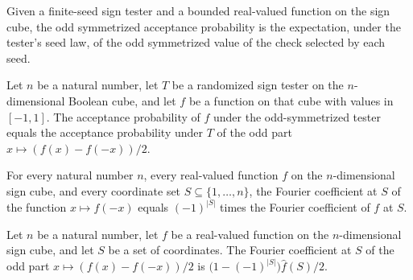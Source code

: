 \begin{definition}
\label{FABL.SignTester.oddSymmetrizedAcceptanceProbability}
\leanok
{}
Given a finite-seed sign tester and a bounded real-valued function on the sign cube, the
odd symmetrized acceptance probability is the expectation, under the tester's seed law,
of the odd symmetrized value of the check selected by each seed.
\end{definition}

\begin{theorem}
\label{FABL.SignTester.oddSymmetrizedAcceptanceProbability_eq_oddPart}
\leanok
{}
Let $n$ be a natural number, let $T$ be a randomized sign tester on the $n$-dimensional
Boolean cube, and let $f$ be a function on that cube with values in $[-1,1]$. The
acceptance probability of $f$ under the odd-symmetrized tester equals the acceptance
probability under $T$ of the odd part $x\mapsto(f(x)-f(-x))/2$.
\end{theorem}

\begin{theorem}
\label{FABL.fourierCoeff_comp_neg}
\leanok
{}
For every natural number $n$, every real-valued function $f$ on the $n$-dimensional sign
cube, and every coordinate set $S\subseteq\{1,\ldots,n\}$, the Fourier coefficient at
$S$ of the function $x\mapsto f(-x)$ equals $(-1)^{|S|}$ times the Fourier coefficient
of $f$ at $S$.
\end{theorem}

\begin{theorem}
\label{FABL.fourierCoeff_oddPart}
\leanok
{}
Let $n$ be a natural number, let $f$ be a real-valued function on the $n$-dimensional
sign cube, and let $S$ be a set of coordinates. The Fourier coefficient at $S$ of the
odd part $x\mapsto (f(x)-f(-x))/2$ is $\bigl(1-(-1)^{|S|}\bigr)\widehat f(S)/2$.
\end{theorem}


